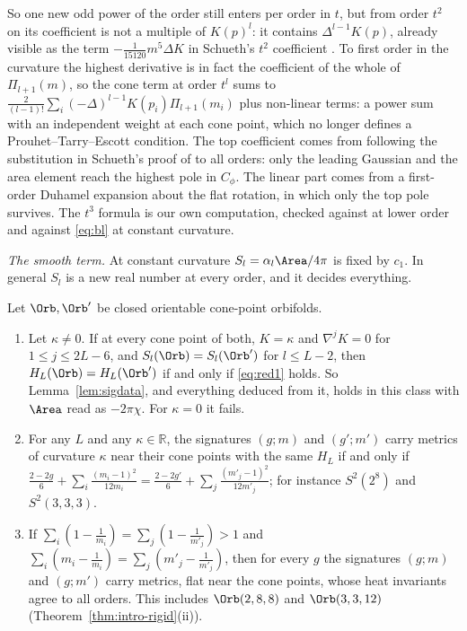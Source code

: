 So one new odd power of the order still enters per order in $t$, but from order $t^2$ on its coefficient
is not a multiple of $K(p)^l$: it contains $\Delta^{l-1}K(p)$, already visible as the term
$-\frac1{15120}m^5\Delta K$ in Schueth's $t^2$ coefficient \cite[Thm~4.1]{schueth2019}. To first order in the
curvature the highest derivative is in fact the coefficient of the whole of $\Pi_{l+1}(m)$, so the cone term at
order $t^l$ sums to $\frac2{(l-1)!}\sum_i(-\Delta)^{l-1}K(p_i)\Pi_{l+1}(m_i)$ plus non-linear terms: a power sum with an
independent weight at each cone point, which no longer defines a Prouhet--Tarry--Escott condition. The top coefficient
comes from following the substitution in Schueth's proof of \cite[Thm~3.7]{schueth2019} to all orders: only the
leading Gaussian and the area element reach the highest pole in $C_\phi$. The linear part comes from a first-order
Duhamel expansion about the flat rotation, in which only the top pole survives. The $t^3$ formula is our own
computation, checked against \cite[Thm~3.7, Thm~4.1]{schueth2019} at lower order and against \eqref{eq:bl}
at constant curvature.

\emph{The smooth term.} At constant curvature $S_l=\alpha_l\Area/4\pi$ is fixed by $c_1$. In general $S_l$
is a new real number at every order, and it decides everything.

\begin{proposition}\label{prop:varcurv}
Let $\Orb,\Orb'$ be closed orientable cone-point orbifolds.
\begin{enumerate}[label=(\roman*)]
\item Let $\kappa\ne0$. If at every cone point of both, $K=\kappa$ and $\nabla^jK=0$ for $1\le j\le2L-6$, and
$S_l(\Orb)=S_l(\Orb')$ for $l\le L-2$, then $H_L(\Orb)=H_L(\Orb')$ if and only if \eqref{eq:red1} holds. So
Lemma~\ref{lem:sigdata}, and everything deduced from it, holds in this class with $\Area$ read as
$-2\pi\chi$. For $\kappa=0$ it fails.
\item For any $L$ and any $\kappa\in\mathbb R$, the signatures $(g;m)$ and $(g';m')$ carry metrics of
curvature $\kappa$ near their cone points with the same $H_L$ if and only if
$\frac{2-2g}6+\sum_i\frac{(m_i-1)^2}{12m_i}=\frac{2-2g'}6+\sum_j\frac{(m'_j-1)^2}{12m'_j}$; for instance
$S^2(2^8)$ and $S^2(3,3,3)$.
\item If $\sum_i(1-\frac1{m_i})=\sum_j(1-\frac1{m'_j})>1$ and $\sum_i(m_i-\frac1{m_i})=\sum_j(m'_j-\frac1{m'_j})$,
then for every $g$ the signatures $(g;m)$ and $(g;m')$ carry metrics, flat near the cone points, whose
heat invariants agree to all orders. This includes $\Orb(2,8,8)$ and $\Orb(3,3,12)$
(Theorem~\ref{thm:intro-rigid}(ii)).
\end{enumerate}
\end{proposition}

